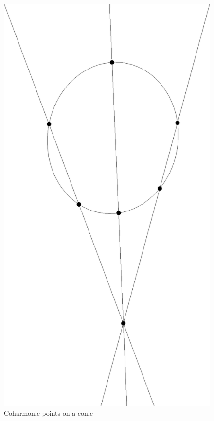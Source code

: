 \documentclass[letterpaper,11pt]{article}
\theoremstyle{definition}
\theoremstyle{remark}
\begin{document}
\begin{figure}[!htb]
\centering
\includegraphics[scale=0.3,angle=270]{coharmonic.eps}
\caption{Coharmonic points on a conic}\label{coharmonic-conic}
\end{figure}
\end{document}
